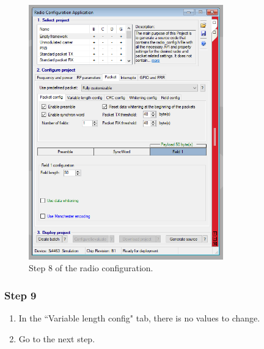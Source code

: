 \begin{figure}[!h]
	\begin{center}
		\includegraphics[width=0.75\textwidth]{figures/wds-tutorial/wds-tutorial-8.png}
		\caption{Step 8 of the radio configuration.}
		\label{fig:wds-tutorial-step-8}
	\end{center}
\end{figure}

\subsubsection{Step 9}

\begin{enumerate}
    \item In the ``Variable length config" tab, there is no values to change.
    \item Go to the next step.
\end{enumerate}


